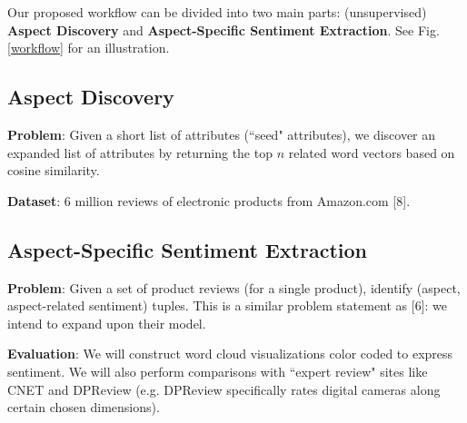 \documentclass{article} %
\begin{document}
Our proposed workflow can be divided into two main parts: (unsupervised) {\bf Aspect Discovery} and {\bf Aspect-Specific Sentiment Extraction}. See Fig. \ref{workflow} for an illustration.

\subsection{Aspect Discovery}

\textbf{Problem}: Given a short list of attributes (``seed" attributes), we discover an expanded list of attributes by returning the top $n$ related word vectors based on cosine similarity.

\textbf{Dataset}: 6 million reviews of electronic products from Amazon.com [8].

\subsection{Aspect-Specific Sentiment Extraction}


\textbf{Problem}: Given a set of product reviews (for a single product), identify (aspect, aspect-related sentiment) tuples. This is a similar problem statement as [6]: we intend to expand upon their model.

\textbf{Evaluation}: We will construct word cloud visualizations color coded to express sentiment. We will also perform comparisons with ``expert review" sites like CNET and DPReview (e.g. DPReview specifically rates digital cameras along certain chosen dimensions).



\end{document}
